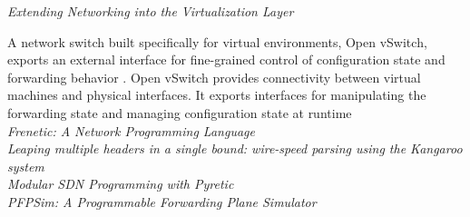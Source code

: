 \noindent \emph{Extending Networking into the Virtualization Layer}

A network switch built specifically for virtual environments, Open vSwitch,
exports an external interface
for fine-grained control of configuration state and forwarding behavior \cite{Pfaff2009}.
Open vSwitch provides
connectivity between virtual machines and physical interfaces. It exports
interfaces for manipulating
the forwarding state and managing configuration state at runtime  
\\

\noindent \emph{Frenetic: A Network Programming Language} 
\cite{Foster:2011:FNP:2034773.2034812}\\

\noindent \emph{Leaping multiple headers in a single bound: wire-speed parsing using the Kangaroo system}
\cite{Kozanitis:2010:LMH:1833515.1833654}\\


\noindent \emph{Modular SDN Programming with Pyretic}
\cite{Reich_modularsdn} \\

\noindent \emph{PFPSim: A Programmable Forwarding Plane Simulator} 

\cite{Abdi:2016:PPF:2881025.2881029}\\






